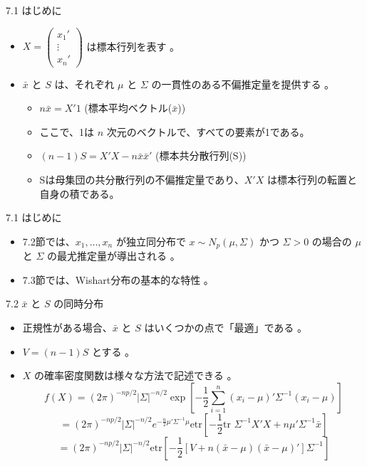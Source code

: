 \documentclass[aspectratio=169]{beamer}
\begin{document}
\begin{frame}{7.1 はじめに}
\begin{itemize}
    \item $X=\begin{pmatrix}x_1' \\ \vdots \\ x_n'\end{pmatrix}$ は標本行列を表す 。
    \item $\bar{x}$ と $S$ は、それぞれ $\mu$ と $\Sigma$ の一貫性のある不偏推定量を提供する 。
    \begin{itemize}
        \item $n\bar{x}=X'1$ (標本平均ベクトル($\bar{x}$))
        \item ここで、1は $n$ 次元のベクトルで、すべての要素が1である。\\
        \item $(n-1)S=X'X-n\bar{x}\bar{x}'$ (標本共分散行列(S))
        \item Sは母集団の共分散行列の不偏推定量であり、$X'X$ は標本行列の転置と自身の積である。
    \end{itemize}

\end{itemize}
\end{frame}
\begin{frame}{7.1 はじめに}
\begin{itemize}
    \item 7.2節では、$x_1, \dots, x_n$ が独立同分布で $x \sim N_p(\mu, \Sigma)$ かつ $\Sigma>0$ の場合の $\mu$ と $\Sigma$ の最尤推定量が導出される 。
    \item 7.3節では、Wishart分布の基本的な特性 。
\end{itemize}
\end{frame}

\begin{frame}{7.2 $\bar{x}$ と $S$ の同時分布}
\begin{itemize}
    \item 正規性がある場合、$\bar{x}$ と $S$ はいくつかの点で「最適」である 。
    \item $V=(n-1)S$ とする 。
    \item $X$ の確率密度関数は様々な方法で記述できる 。
    \begin{equation*}
    f(X) = (2\pi)^{-np/2} |\Sigma|^{-n/2} \exp\left[-\frac{1}{2} \sum_{i=1}^{n} (x_i - \mu)' \Sigma^{-1} (x_i - \mu)\right] \tag{7.1}
    \end{equation*}
    \begin{equation*}
    = (2\pi)^{-np/2} |\Sigma|^{-n/2} e^{-\frac{n}{2}\mu'\Sigma^{-1}\mu} \text{etr}\left[-\frac{1}{2}\text{tr }\Sigma^{-1}X'X + n\mu'\Sigma^{-1}\bar{x}\right] 
    \end{equation*}
    \begin{equation*}
    = (2\pi)^{-np/2} |\Sigma|^{-n/2} \text{etr}\left[-\frac{1}{2}[V + n(\bar{x} - \mu)(\bar{x} - \mu)']\Sigma^{-1}\right] 
    \end{equation*}
\end{itemize}
\end{frame}
\end{document}
